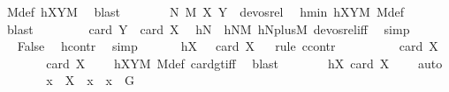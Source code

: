 \begin{isabellebody}
\ M{\isacharunderscore}{\kern0pt}def\ hXYM\ \isamarkupfalse%
\ blast\isanewline
\ \ \ \ \isamarkupfalse%
\ \isamarkupfalse%
\ {\isachardoublequoteopen}{\isacharparenleft}{\kern0pt}{\isacharparenleft}{\kern0pt}{\isacharquery}{\kern0pt}N{\isacharcomma}{\kern0pt}\ {\isacharquery}{\kern0pt}M{\isacharparenright}{\kern0pt}{\isacharcomma}{\kern0pt}\ {\isacharparenleft}{\kern0pt}X{\isacharcomma}{\kern0pt}\ Y{\isacharparenright}{\kern0pt}{\isacharparenright}{\kern0pt}\ {\isasymnotin}\ devos{\isacharunderscore}{\kern0pt}rel{\isachardoublequoteclose}\ \isamarkupfalse%
\ hmin\ hXYM\ M{\isacharunderscore}{\kern0pt}def\ \isamarkupfalse%
\ blast\isanewline
\ \ \ \ \isamarkupfalse%
\ \isamarkupfalse%
\ {\isachardoublequoteopen}{\isasymnot}\ card\ Y\ {\isacharless}{\kern0pt}\ card\ X{\isachardoublequoteclose}\ \isamarkupfalse%
\ hN\ \ hNM\ hNplusM\ devos{\isacharunderscore}{\kern0pt}rel{\isacharunderscore}{\kern0pt}iff\ \isamarkupfalse%
\ simp\isanewline
\ \ \ \ \isamarkupfalse%
\ \isamarkupfalse%
\ False\ \isamarkupfalse%
\ hcontr\ \isamarkupfalse%
\ simp\isanewline
\ \ \isamarkupfalse%
\isanewline
\ \ \isamarkupfalse%
\ hX{}{\isacharcolon}{\kern0pt}\ {\isachardoublequoteopen}{}\ {\isasymle}\ card\ X{\isachardoublequoteclose}\isanewline
\ \ \isamarkupfalse%
{\isacharparenleft}{\kern0pt}rule\ ccontr{\isacharparenright}{\kern0pt}\isanewline
\ \ \ \ \isamarkupfalse%
\ {\isachardoublequoteopen}\ {\isasymnot}\ {}\ {\isasymle}\ card\ X{\isachardoublequoteclose}\isanewline
\ \ \ \ \isamarkupfalse%
\ \isamarkupfalse%
\ {\isachardoublequoteopen}card\ X\ {\isachargreater}{\kern0pt}\ {}{\isachardoublequoteclose}\ \isamarkupfalse%
\ hXYM\ M{\isacharunderscore}{\kern0pt}def\ card{\isacharunderscore}{\kern0pt}gt{\isacharunderscore}{\kern0pt}{}{\isacharunderscore}{\kern0pt}iff\ \isamarkupfalse%
\ blast\isanewline
\ \ \ \ \isamarkupfalse%
\ \isamarkupfalse%
\ hX{}{\isacharcolon}{\kern0pt}\ {\isachardoublequoteopen}card\ X\ {\isacharequal}{\kern0pt}\ {}{\isachardoublequoteclose}\ \isamarkupfalse%
\ auto\isanewline
\ \ \ \ \isamarkupfalse%
\ \isamarkupfalse%
\ x\ \ {\isachardoublequoteopen}X\ {\isacharequal}{\kern0pt}\ {\isacharbraceleft}{\kern0pt}x{\isacharbraceright}{\kern0pt}{\isachardoublequoteclose}\ \ {\isachardoublequoteopen}x\ {\isasymin}\ G{\isachardoublequoteclose}\ \isamarkupfalse%

\end{isabellebody}
